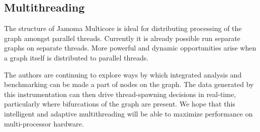 \documentclass[twoside,a4paper]{article}
\begin{document}


\subsection{Multithreading} %

The structure of Jamoma Multicore is ideal for distributing processing of the graph amongst parallel threads.  
Currently it is already possible run separate graphs on separate threads.  
More powerful and dynamic opportunities arise when a graph itself is distributed to parallel threads.  

The authors are continuing to explore ways by which integrated analysis and benchmarking can be made a part of nodes on the graph.  
The data generated by this instrumentation can then drive thread-spawning decisions in real-time, particularly where bifurcations of the graph are present.  
We hope that this intelligent and adaptive multithreading will be able to maximize performance on multi-processor hardware.

%   









\end{document}
